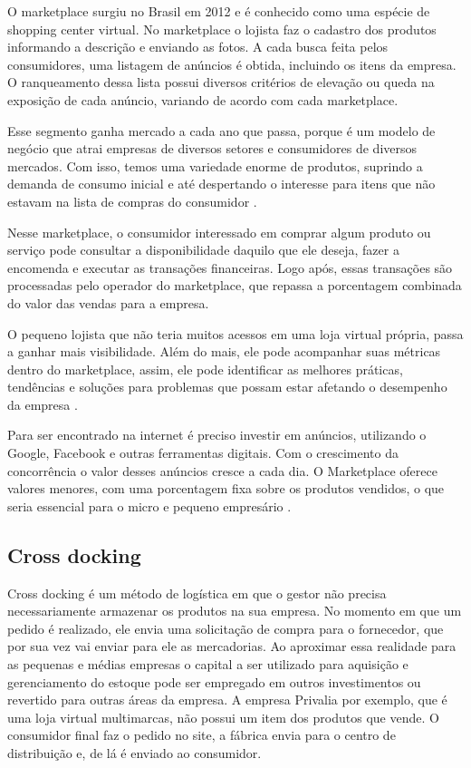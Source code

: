 O marketplace surgiu no Brasil em 2012 e é conhecido como uma espécie de shopping center virtual. No marketplace o lojista faz o cadastro dos produtos informando a descrição e enviando as fotos. A cada busca feita pelos consumidores, uma listagem de anúncios é obtida, incluindo os itens da empresa. O ranqueamento dessa lista possui diversos critérios de elevação ou queda na exposição de cada anúncio, variando de acordo com cada marketplace.

Esse segmento ganha mercado a cada ano que passa, porque é um modelo de negócio que atrai empresas de diversos setores e consumidores de diversos mercados. Com isso, temos uma variedade enorme de produtos, suprindo a demanda de consumo inicial e até despertando o interesse para itens que não estavam na lista de compras do consumidor \cite{ecombrmkt}.

Nesse marketplace, o consumidor interessado em comprar algum produto ou serviço pode consultar a disponibilidade daquilo que ele deseja, fazer a encomenda e executar as transações financeiras. Logo após, essas transações são processadas pelo operador do marketplace, que repassa a porcentagem combinada do valor das vendas para a empresa.

O pequeno lojista que não teria muitos acessos em uma loja virtual própria, passa a ganhar mais visibilidade. Além do mais, ele pode acompanhar suas métricas dentro do marketplace, assim, ele pode identificar as melhores práticas, tendências e soluções para problemas que possam estar afetando o desempenho da empresa \cite{marktsebrae}.

Para ser encontrado na internet é preciso investir em anúncios, utilizando o Google, Facebook e outras ferramentas digitais. Com o crescimento da concorrência o valor desses anúncios cresce a cada dia. O Marketplace oferece valores menores, com uma porcentagem fixa sobre os produtos vendidos, o que seria essencial para o micro e pequeno empresário \cite{marktecbr}.

\subsection{Cross docking}
\label{subsec:framing}

Cross docking é um método de logística em que o gestor não precisa necessariamente armazenar os produtos na sua empresa. No momento em que um pedido é realizado, ele envia uma solicitação de compra para o fornecedor, que por sua vez vai enviar para ele as mercadorias. Ao aproximar essa realidade para as pequenas e médias empresas o capital a ser utilizado para aquisição e gerenciamento do estoque pode ser empregado em outros investimentos ou revertido para outras áreas da empresa. A empresa Privalia por exemplo, que é uma loja virtual multimarcas, não possui um item dos produtos que vende. O consumidor final faz o pedido no site, a fábrica envia para o centro de distribuição e, de lá é enviado ao consumidor.


